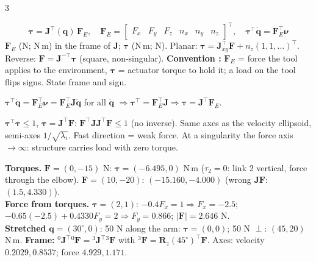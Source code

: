 \begin{multicols}{3}
\begin{fbx}
\[\boldsymbol\tau=\mathbf J^\top(\mathbf q)\,\mathbf F_E,\quad\mathbf F_E=\begin{bmatrix}F_x&F_y&F_z&n_x&n_y&n_z\end{bmatrix}^\top,\quad\boldsymbol\tau^\top\dot{\mathbf q}=\mathbf F_E^\top\boldsymbol\nu\]
$\mathbf F_E$ (N; N\,m) in the frame of $\mathbf J$; $\boldsymbol\tau$ (N\,m; N). Planar: $\boldsymbol\tau=\mathbf J_{xy}^\top\mathbf F+n_z(1,1,\dots)^\top$. Reverse: $\mathbf F=\mathbf J^{-\top}\boldsymbol\tau$ (square, non-singular). \textbf{Convention \added:} $\mathbf F_E$ = force the tool applies to the environment, $\boldsymbol\tau$ = actuator torque to hold it; a load on the tool flips signs. State frame and sign.
\end{fbx}
\begin{deriv}
$\boldsymbol\tau^\top\dot{\mathbf q}=\mathbf F_E^\top\boldsymbol\nu=\mathbf F_E^\top\mathbf J\dot{\mathbf q}$ for all $\dot{\mathbf q}$ $\Rightarrow\boldsymbol\tau^\top=\mathbf F_E^\top\mathbf J\Rightarrow\boldsymbol\tau=\mathbf J^\top\mathbf F_E$.
\end{deriv}
\begin{fbx}
$\boldsymbol\tau^\top\boldsymbol\tau\le1$, $\boldsymbol\tau=\mathbf J^\top\mathbf F$: $\mathbf F^\top\mathbf J\mathbf J^\top\mathbf F\le1$ (no inverse). Same axes as the velocity ellipsoid, semi-axes $1/\sqrt{\lambda_i}$. Fast direction = weak force. At a singularity the force axis $\to\infty$: structure carries load with zero torque.
\end{fbx}
\begin{worked}[$L=(0.5,0.4)$, $\mathbf q=(30^\circ,60^\circ)$; $\mathbf J^\top=\begin{bmatrix}-0.65&0.4330\\-0.4&0\end{bmatrix}$]
\textbf{Torques.} $\mathbf F=(0,-15)$ N: $\boldsymbol\tau=(-6.495,0)$ N\,m ($\tau_2=0$: link 2 vertical, force through the elbow). $\mathbf F=(10,-20)$: $(-15.160,-4.000)$ (wrong $\mathbf J\mathbf F$: $(1.5,4.330)$).\\
\textbf{Force from torques.} $\boldsymbol\tau=(2,1)$: $-0.4F_x=1\Rightarrow F_x=-2.5$; $-0.65(-2.5)+0.4330F_y=2\Rightarrow F_y=0.866$; $|\mathbf F|=2.646$ N.\\
\textbf{Stretched} $\mathbf q=(30^\circ,0)$: 50 N along the arm: $\boldsymbol\tau=(0,0)$; 50 N $\perp$: $(45,20)$ N\,m. \textbf{Frame:} ${}^0\mathbf J^\top{}^0\mathbf F={}^3\mathbf J^\top{}^3\mathbf F$ with ${}^3\mathbf F=\mathbf R_z(45^\circ)^\top\mathbf F$. Axes: velocity $0.2029,0.8537$; force $4.929,1.171$. \chk

\end{worked}
\end{multicols}
